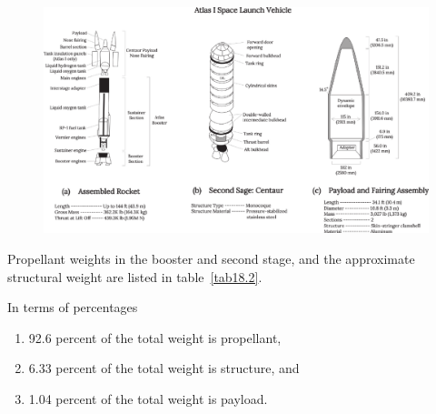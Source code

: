 \documentclass{AeroStructure-ERJohnson}
\begin{document}
{\def\thefigure{18.1}
\begin{figure}
\begin{center}
\includegraphics{Figure_18-1.pdf}
\caption{\label{fig18.1}}
\end{center}
\end{figure}
}




Propellant weights in the booster and second stage, and the approximate structural weight are listed in table~\ref{tab18.2}.

\begin{table}[h]%
\vspace*{-0.6pc}
\vspace*{-1pc}
\end{table}

In terms of percentages
\begin{enumerate}\leftskip=12pt
  \item[] 92.6 percent of the total weight is propellant,
  \item[] 6.33 percent of the total weight is structure, and
  \item[] 1.04 percent of the total weight is payload.
\end{enumerate}
\end{document}
